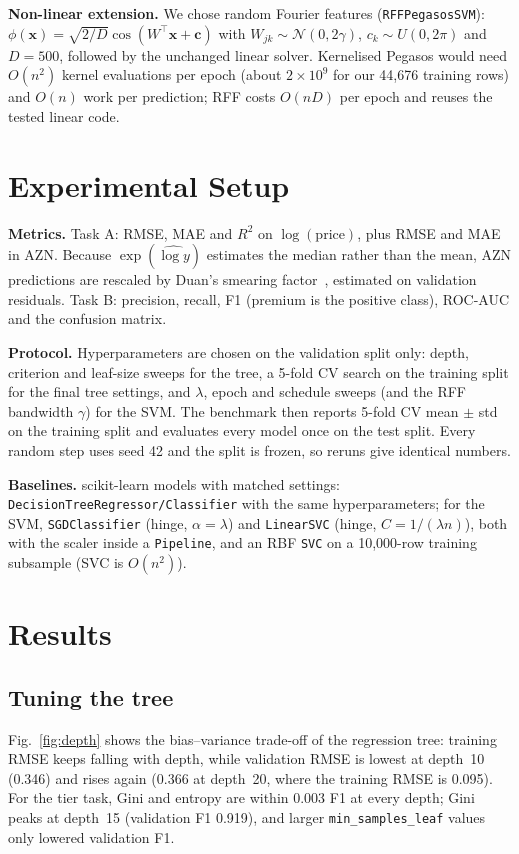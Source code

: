 \documentclass[10pt,twocolumn,a4paper]{article}
\newcommand{\code}[1]{\texttt{#1}}
\begin{document}
\textbf{Non-linear extension.} We chose random Fourier features
(\code{RFFPegasosSVM}): $\phi(\mathbf{x})=\sqrt{2/D}\cos(W^\top\mathbf{x}+\mathbf{c})$
with $W_{jk}\sim\mathcal{N}(0,2\gamma)$, $c_k\sim U(0,2\pi)$ and $D=500$,
followed by the unchanged linear solver. Kernelised Pegasos would need
$O(n^2)$ kernel evaluations per epoch (about $2\times10^9$ for our 44,676
training rows) and $O(n)$ work per prediction; RFF costs $O(nD)$ per epoch
and reuses the tested linear code.

\section{Experimental Setup}
\textbf{Metrics.} Task A: RMSE, MAE and $R^2$ on $\log(\text{price})$,
plus RMSE and MAE in AZN. Because $\exp(\widehat{\log y})$ estimates the
median rather than the mean, AZN predictions are rescaled by Duan's
smearing factor~\cite{duan}, estimated on validation residuals. Task B:
precision, recall, F1 (premium is the positive class), ROC-AUC and the
confusion matrix.

\textbf{Protocol.} Hyperparameters are chosen on the validation split
only: depth, criterion and leaf-size sweeps for the tree, a 5-fold CV
search on the training split for the final tree settings, and $\lambda$,
epoch and schedule sweeps (and the RFF bandwidth $\gamma$) for the SVM.
The benchmark then reports 5-fold CV mean $\pm$ std on the training split
and evaluates every model once on the test split. Every random step uses
seed 42 and the split is frozen, so reruns give identical numbers.

\textbf{Baselines.} scikit-learn models with matched settings:
\code{DecisionTreeRegressor/Classifier} with the same hyperparameters;
for the SVM, \code{SGDClassifier} (hinge, $\alpha=\lambda$) and
\code{LinearSVC} (hinge, $C=1/(\lambda n)$), both with the scaler inside a
\code{Pipeline}, and an RBF \code{SVC} on a 10,000-row training subsample
(SVC is $O(n^2)$).

\section{Results}
\subsection{Tuning the tree}
Fig.~\ref{fig:depth} shows the bias--variance trade-off of the regression
tree: training RMSE keeps falling with depth, while validation RMSE is
lowest at depth~10 (0.346) and rises again (0.366 at depth~20, where the
training RMSE is 0.095). For the tier task, Gini and entropy are within
0.003 F1 at every depth; Gini peaks at depth~15 (validation F1 0.919), and
larger \code{min\_samples\_leaf} values only lowered validation F1.
\end{document}
